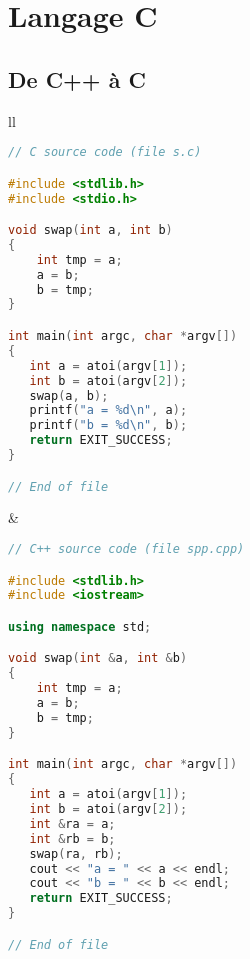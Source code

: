 \section{Langage C}

\subsection{De C++ à C}
\begin{tabular}{ll}
\begin{minipage}[t]{0.45\textwidth}
\begin{lstlisting}[language=c]
// C source code (file s.c)

#include <stdlib.h>
#include <stdio.h>

void swap(int a, int b)
{
	int tmp = a;
	a = b;
	b = tmp;
}

int main(int argc, char *argv[])
{
   int a = atoi(argv[1]);
   int b = atoi(argv[2]);
   swap(a, b);
   printf("a = %d\n", a);
   printf("b = %d\n", b);
   return EXIT_SUCCESS;
}

// End of file
\end{lstlisting}
\end{minipage}
&
\begin{minipage}[t]{0.45\textwidth}
\begin{lstlisting}[language=c++]
// C++ source code (file spp.cpp)

#include <stdlib.h>
#include <iostream>

using namespace std;

void swap(int &a, int &b)
{
	int tmp = a;
	a = b;
	b = tmp;
}

int main(int argc, char *argv[])
{
   int a = atoi(argv[1]);
   int b = atoi(argv[2]);
   int &ra = a;
   int &rb = b;
   swap(ra, rb);
   cout << "a = " << a << endl;
   cout << "b = " << b << endl;
   return EXIT_SUCCESS;
}

// End of file
\end{lstlisting}
\end{minipage}
\end{tabular}




